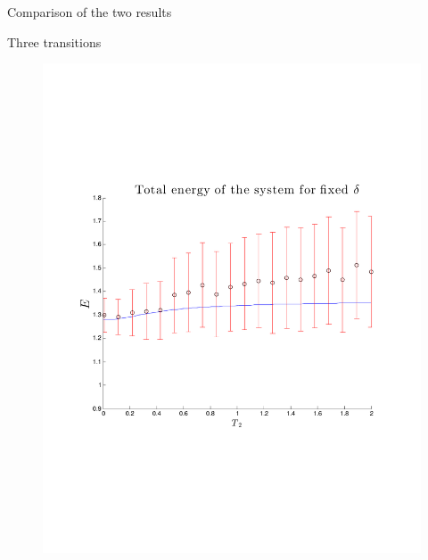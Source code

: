 \begin{frame}{Comparison of the two results}
\begin{minipage}{0.49\textwidth}
\begin{block}{Three transitions}
      	  			\vspace{-1.7cm}
      	  				\begin{figure}
      	  						\centering
      	  						\includegraphics[width=\textwidth]{../src/plot/discreteSystems/AllInOneFixedTemp3transitions.pdf}
      	  					\end{figure}
      	  		  	\end{block}
      	  	\end{minipage}

      	
\end{frame}